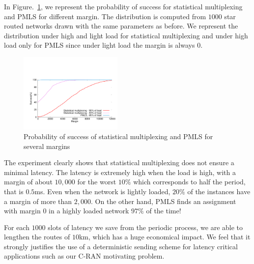 \documentclass[10pt, conference, letterpaper]{IEEEtran}
\begin{document}
     In Figure.~\ref{fig:sto}, we represent the probability of success for 
     statistical multiplexing and PMLS for different margin. The distribution is computed from $1000$ star routed networks drawn with the same parameters as before. We represent the distribution under high and light load for statistical multiplexing and under high load only for PMLS since under light load the margin is always $0$. 
     

    \begin{figure}
       \begin{center}
      \includegraphics[width = 0.45\textwidth]{stochastic.pdf}
      \end{center}
      \caption{Probability of success of statistical multiplexing and PMLS for several margins}
      \label{fig:sto}   
     \end{figure}    
     
     The experiment clearly shows that statistical multiplexing does not ensure a minimal latency. 
     The latency is extremely high when the load is high, with a margin of about $10,000$ for the worst $10\%$ which corresponds to half the period, that is $0.5$ms. Even when the network is lightly loaded, $20\%$ of the instances have a margin of more than $2,000$. On the other hand, PMLS finds an assignment with margin $0$ in a highly loaded network $97\%$ of the time! 

     For each $1000$ slots of latency we save from the periodic process, we are able to lengthen the routes of $10$km, which has a huge economical impact. We feel that it strongly justifies the use of a deterministic sending scheme for latency critical applications such as our C-RAN motivating problem.     
\end{document}
